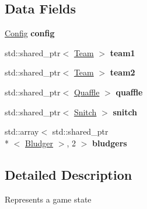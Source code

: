 \subsection*{Data Fields}
\begin{DoxyCompactItemize}
\item 
\hypertarget{classgame_model_1_1_environment_ab279f79f3801407b32364c5561ba4dcf}{\hyperlink{classgame_model_1_1_config}{Config} {\bfseries config}}\label{classgame_model_1_1_environment_ab279f79f3801407b32364c5561ba4dcf}

\item 
\hypertarget{classgame_model_1_1_environment_a2e14ce1ffd7e2a129ae81c686adbef0f}{std\-::shared\-\_\-ptr$<$ \hyperlink{classgame_model_1_1_team}{Team} $>$ {\bfseries team1}}\label{classgame_model_1_1_environment_a2e14ce1ffd7e2a129ae81c686adbef0f}

\item 
\hypertarget{classgame_model_1_1_environment_a24a032c88b96f1aa9dc33cbacb5a85b7}{std\-::shared\-\_\-ptr$<$ \hyperlink{classgame_model_1_1_team}{Team} $>$ {\bfseries team2}}\label{classgame_model_1_1_environment_a24a032c88b96f1aa9dc33cbacb5a85b7}

\item 
\hypertarget{classgame_model_1_1_environment_a53045a75cb3c499bdfe45f2d3d36752f}{std\-::shared\-\_\-ptr$<$ \hyperlink{classgame_model_1_1_quaffle}{Quaffle} $>$ {\bfseries quaffle}}\label{classgame_model_1_1_environment_a53045a75cb3c499bdfe45f2d3d36752f}

\item 
\hypertarget{classgame_model_1_1_environment_aec8a2937f90f5ff967bbc57f17ffc15f}{std\-::shared\-\_\-ptr$<$ \hyperlink{classgame_model_1_1_snitch}{Snitch} $>$ {\bfseries snitch}}\label{classgame_model_1_1_environment_aec8a2937f90f5ff967bbc57f17ffc15f}

\item 
\hypertarget{classgame_model_1_1_environment_afe22e5667c13829e787ef4df6a9e9ee8}{std\-::array$<$ std\-::shared\-\_\-ptr\\*
$<$ \hyperlink{classgame_model_1_1_bludger}{Bludger} $>$, 2 $>$ {\bfseries bludgers}}\label{classgame_model_1_1_environment_afe22e5667c13829e787ef4df6a9e9ee8}

\end{DoxyCompactItemize}


\subsection{Detailed Description}
Represents a game state 

